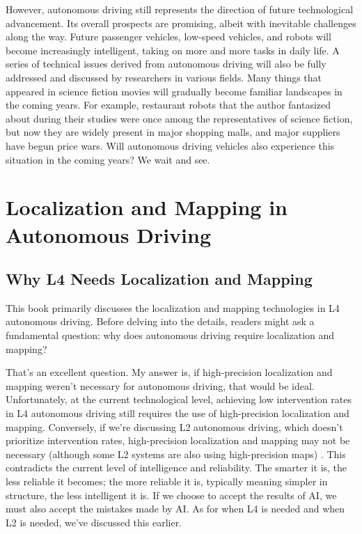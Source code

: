 However, autonomous driving still represents the direction of future technological advancement. Its overall prospects are promising, albeit with inevitable challenges along the way. Future passenger vehicles, low-speed vehicles, and robots will become increasingly intelligent, taking on more and more tasks in daily life. A series of technical issues derived from autonomous driving will also be fully addressed and discussed by researchers in various fields. Many things that appeared in science fiction movies will gradually become familiar landscapes in the coming years. For example, restaurant robots that the author fantasized about during their studies were once among the representatives of science fiction, but now they are widely present in major shopping malls, and major suppliers have begun price wars. Will autonomous driving vehicles also experience this situation in the coming years? We wait and see.

\section{Localization and Mapping in Autonomous Driving}
\subsection{Why L4 Needs Localization and Mapping}
This book primarily discusses the localization and mapping technologies in L4 autonomous driving. Before delving into the details, readers might ask a fundamental question: why does autonomous driving require localization and mapping?

That's an excellent question. My answer is, if high-precision localization and mapping weren't necessary for autonomous driving, that would be ideal. Unfortunately, at the current technological level, achieving low intervention rates in L4 autonomous driving still requires the use of high-precision localization and mapping. Conversely, if we're discussing L2 autonomous driving, which doesn't prioritize intervention rates, high-precision localization and mapping may not be necessary (although some L2 systems are also using high-precision maps) \cite{Zhang2021, Ort2020, Can2020}. This contradicts the current level of intelligence and reliability. The smarter it is, the less reliable it becomes; the more reliable it is, typically meaning simpler in structure, the less intelligent it is. If we choose to accept the results of AI, we must also accept the mistakes made by AI. As for when L4 is needed and when L2 is needed, we've discussed this earlier.

